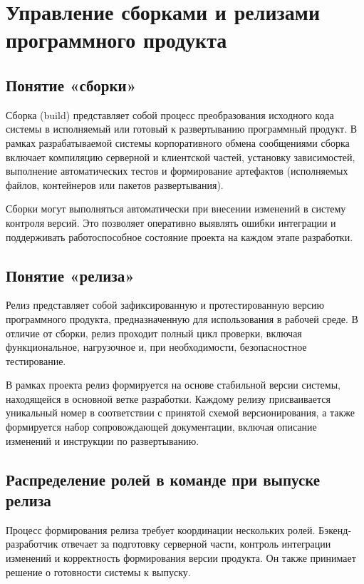 \documentclass[14pt,a4paper]{extarticle}
\begin{document}
\section{Управление сборками и релизами программного продукта}

\subsection{Понятие «сборки»}

Сборка (build) представляет собой процесс преобразования исходного кода системы в исполняемый или готовый к развертыванию программный продукт. В рамках разрабатываемой системы корпоративного обмена сообщениями сборка включает компиляцию серверной и клиентской частей, установку зависимостей, выполнение автоматических тестов и формирование артефактов (исполняемых файлов, контейнеров или пакетов развертывания).

Сборки могут выполняться автоматически при внесении изменений в систему контроля версий. Это позволяет оперативно выявлять ошибки интеграции и поддерживать работоспособное состояние проекта на каждом этапе разработки.

\subsection{Понятие «релиза»}

Релиз представляет собой зафиксированную и протестированную версию программного продукта, предназначенную для использования в рабочей среде. В отличие от сборки, релиз проходит полный цикл проверки, включая функциональное, нагрузочное и, при необходимости, безопасностное тестирование.

В рамках проекта релиз формируется на основе стабильной версии системы, находящейся в основной ветке разработки. Каждому релизу присваивается уникальный номер в соответствии с принятой схемой версионирования, а также формируется набор сопровождающей документации, включая описание изменений и инструкции по развертыванию.

\subsection{Распределение ролей в команде при выпуске релиза}

Процесс формирования релиза требует координации нескольких ролей. Бэкенд-разработчик отвечает за подготовку серверной части, контроль интеграции изменений и корректность формирования версии продукта. Он также принимает решение о готовности системы к выпуску.
\end{document}
